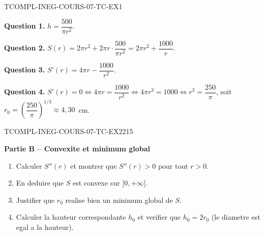 \begin{corrige}{TCOMPL-INEG-COURS-07-TC-EX1}

\textbf{Question 1.} $h = \dfrac{500}{\pi r^2}$.

\textbf{Question 2.} $S(r) = 2\pi r^2 + 2\pi r \cdot \dfrac{500}{\pi r^2} = 2\pi r^2 + \dfrac{1000}{r}$.


\textbf{Question 3.} $S'(r) = 4\pi r - \dfrac{1000}{r^2}$.

\textbf{Question 4.} $S'(r) = 0 \iff 4\pi r = \dfrac{1000}{r^2} \iff 4\pi r^3 = 1000 \iff r^3 = \dfrac{250}{\pi}$, soit $r_0 = \left(\dfrac{250}{\pi}\right)^{1/3} \approx 4{,}30$~cm.

\end{corrige}

\bigskip


\begin{exercice}{TCOMPL-INEG-COURS-07-TC-EX2}{2}{15}

\textbf{Partie B -- Convexite et minimum global}

\begin{enumerate}
  \item Calculer $S''(r)$ et montrer que $S''(r) > 0$ pour tout $r > 0$.
  \item En deduire que $S$ est convexe sur $]0, +\infty[$.
  \item Justifier que $r_0$ realise bien un minimum global de $S$.
  \item Calculer la hauteur correspondante $h_0$ et verifier que $h_0 = 2r_0$ (le diametre est egal a la hauteur).
\end{enumerate}

\end{exercice}

